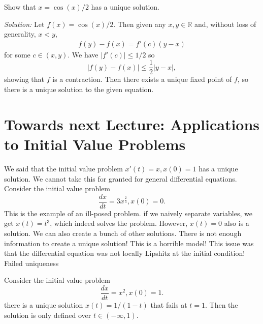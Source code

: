 \documentclass[11pt]{article}
\theoremstyle{definition}
\newcommand{\R}{\mathbb{R}}                      %
\begin{document}
\ex Show that $x=\cos (x)/2$ has a unique solution.

\textit{Solution:} Let $f(x)=\cos (x)/2$. Then given any $x,y\in\R$ and, without loss of generality, $x<y$,
\begin{align*}
    f(y)-f(x)=f'(c)(y-x)
\end{align*}
for some $c\in (x,y)$. We have $|f'(c)|\leq 1/2$ so 
$$
|f(y)-f(x)|\leq \frac{1}{2}|y-x|,
$$
showing that $f$ is a contraction. Then there exists a unique fixed point of $f$, so there is a unique solution to the given equation.

\section{Towards next Lecture: Applications to Initial Value Problems}

We said that the initial value problem $x'(t)=x, x(0)=1$ has a unique solution. We cannot take this for granted for general differential equations.
\ex Consider the initial value problem
$$
\frac{dx}{dt}=3x^{\frac{2}{3}}, x(0)=0.
$$
This is the example of an ill-posed problem. if we naively separate variables, we get $x(t)=t^3$, which indeed solves the problem. However, $x(t)=0$ also is a solution. We can also create a bunch of other solutions. There is not enough information to create a unique solution! This is a horrible model! This issue was that the differential equation was not locally Lipshitz at the initial condition! Failed uniqueness

\ex Consider the initial value problem
$$
\frac{dx}{dt}= x^2, x(0)=1.
$$
there is a unique solution $x(t)=1/(1-t)$ that fails at $t=1$. Then the solution is only defined over $t\in (-\infty,1)$.
\end{document}
